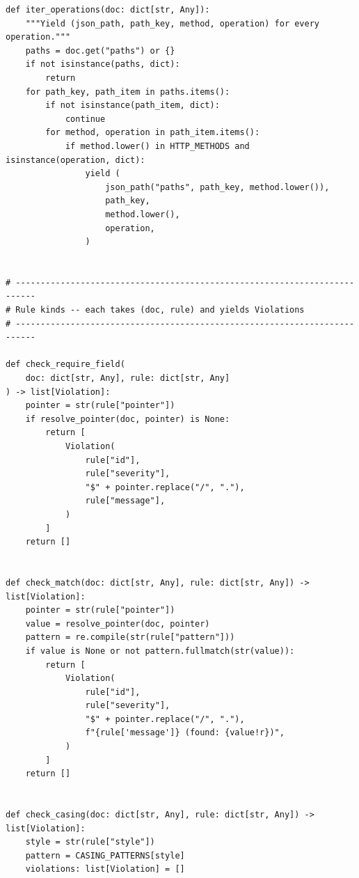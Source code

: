 \begin{verbatim}
def iter_operations(doc: dict[str, Any]):
    """Yield (json_path, path_key, method, operation) for every operation."""
    paths = doc.get("paths") or {}
    if not isinstance(paths, dict):
        return
    for path_key, path_item in paths.items():
        if not isinstance(path_item, dict):
            continue
        for method, operation in path_item.items():
            if method.lower() in HTTP_METHODS and isinstance(operation, dict):
                yield (
                    json_path("paths", path_key, method.lower()),
                    path_key,
                    method.lower(),
                    operation,
                )


# --------------------------------------------------------------------------
# Rule kinds -- each takes (doc, rule) and yields Violations
# --------------------------------------------------------------------------

def check_require_field(
    doc: dict[str, Any], rule: dict[str, Any]
) -> list[Violation]:
    pointer = str(rule["pointer"])
    if resolve_pointer(doc, pointer) is None:
        return [
            Violation(
                rule["id"],
                rule["severity"],
                "$" + pointer.replace("/", "."),
                rule["message"],
            )
        ]
    return []


def check_match(doc: dict[str, Any], rule: dict[str, Any]) -> list[Violation]:
    pointer = str(rule["pointer"])
    value = resolve_pointer(doc, pointer)
    pattern = re.compile(str(rule["pattern"]))
    if value is None or not pattern.fullmatch(str(value)):
        return [
            Violation(
                rule["id"],
                rule["severity"],
                "$" + pointer.replace("/", "."),
                f"{rule['message']} (found: {value!r})",
            )
        ]
    return []


def check_casing(doc: dict[str, Any], rule: dict[str, Any]) -> list[Violation]:
    style = str(rule["style"])
    pattern = CASING_PATTERNS[style]
    violations: list[Violation] = []


\end{verbatim}
